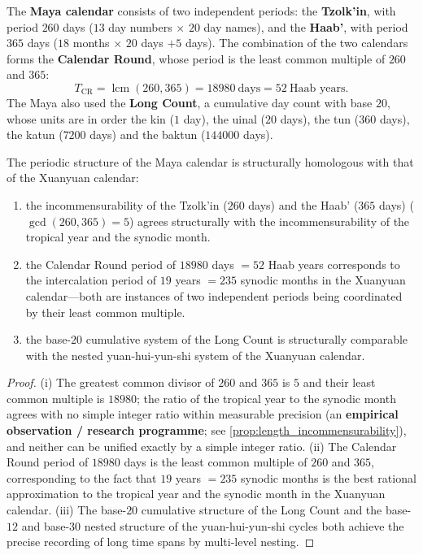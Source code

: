 \begin{definition}\label{def:maya_calendar}
The \textbf{Maya calendar} consists of two independent periods: the \textbf{Tzolk'in}, with period \(260\) days (\(13\) day numbers \(\times\) \(20\) day names), and the \textbf{Haab'}, with period \(365\) days (\(18\) months \(\times\) \(20\) days \(+5\) days). The combination of the two calendars forms the \textbf{Calendar Round}, whose period is the least common multiple of \(260\) and \(365\):
\[
T_{\text{CR}}=\operatorname{lcm}(260,365)=18980\ \text{days}=52\ \text{Haab years}.
\]
The Maya also used the \textbf{Long Count}, a cumulative day count with base \(20\), whose units are in order the kin (\(1\) day), the uinal (\(20\) days), the tun (\(360\) days), the katun (\(7200\) days) and the baktun (\(144000\) days).
\end{definition}

\begin{proposition}\label{prop:maya_calendar_coordination}
The periodic structure of the Maya calendar is structurally homologous with that of the Xuanyuan calendar:
\begin{enumerate}[label=(\roman*)]
    \item the incommensurability of the Tzolk'in (\(260\) days) and the Haab' (\(365\) days) (\(\gcd(260,365)=5\)) agrees structurally with the incommensurability of the tropical year and the synodic month.
    \item the Calendar Round period of \(18980\) days \(=52\) Haab years corresponds to the intercalation period of \(19\) years \(=235\) synodic months in the Xuanyuan calendar---both are instances of two independent periods being coordinated by their least common multiple.
    \item the base-\(20\) cumulative system of the Long Count is structurally comparable with the nested yuan-hui-yun-shi system of the Xuanyuan calendar.
\end{enumerate}
\end{proposition}

\begin{proof}
(i) The greatest common divisor of \(260\) and \(365\) is \(5\) and their least common multiple is \(18980\); the ratio of the tropical year to the synodic month agrees with no simple integer ratio within measurable precision (an \textbf{empirical observation / research programme}; see \cref{prop:length_incommensurability}), and neither can be unified exactly by a simple integer ratio.
(ii) The Calendar Round period of \(18980\) days is the least common multiple of \(260\) and \(365\), corresponding to the fact that \(19\) years \(=235\) synodic months is the best rational approximation to the tropical year and the synodic month in the Xuanyuan calendar.
(iii) The base-\(20\) cumulative structure of the Long Count and the base-\(12\) and base-\(30\) nested structure of the yuan-hui-yun-shi cycles both achieve the precise recording of long time spans by multi-level nesting.
\end{proof}

